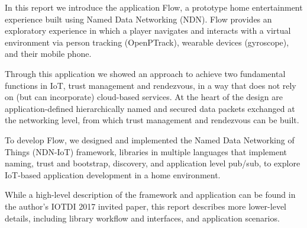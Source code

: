 In this report we introduce the application Flow, a prototype home entertainment experience built using Named Data Networking (NDN).
Flow provides an exploratory experience in which a player navigates and interacts with a virtual environment via person tracking (OpenPTrack), wearable devices (gyroscope), and their mobile phone.

Through this application we showed an approach to achieve two fundamental functions in IoT, trust management and rendezvous, in a way that does not rely on (but can incorporate) cloud-based services.
At the heart of the design are application-defined hierarchically named and secured data packets exchanged at the networking level, from which trust management and rendezvous can be built. 

To develop Flow, we designed and implemented the Named Data Networking of Things (NDN-IoT) framework, libraries in multiple languages that implement naming, trust and bootstrap, discovery, and application level pub/sub, to explore IoT-based application development in a home environment.

While a high-level description of the framework and application can be found in the author's IOTDI 2017 invited paper, this report describes more lower-level details, including library workflow and interfaces, and application scenarios.

